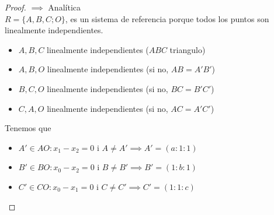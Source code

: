 \begin{proof}
$\implies$ Analítica \\
$R = \{A,B,C;O\}$, es un sistema de referencia porque todos los puntos son linealmente independientes.
\begin{itemize}
    \item $A,B,C$ linealmente independientes ($ABC$ triangulo)
    \item $A,B,O$ linealmente independientes (si no, $AB = A'B'$)
    \item $B,C,O$ linealmente independientes (si no, $BC = B'C'$)
    \item $C,A,O$ linealmente independientes (si no, $AC = A'C'$)
\end{itemize}
Tenemos que
\begin{itemize}
    \item $A' \in AO : x_1 - x_2 = 0$ i $A \neq A' \implies A' = (a:1:1)$
    \item $B' \in BO : x_0 - x_2 = 0$ i $B \neq B' \implies B' = (1:b:1)$
    \item $C' \in CO : x_0 - x_1 = 0$ i $C \neq C' \implies C' = (1:1:c)$
\end{itemize}


\end{proof}
